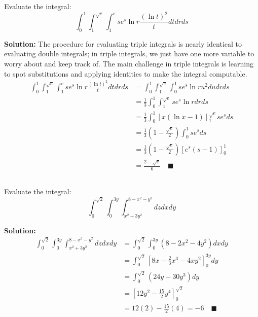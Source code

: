 \documentclass[letterpaper, 11pt]{article}
\begin{document}
\subsection{} Evaluate the integral:
\[ \int_0^1 \int_1^{\sqrt{e}} \int_1^e se^s \ln r \frac{(\ln t)^2}{t} dt dr ds \]
\par \textbf{Solution:} The procedure for evaluating triple integrals is nearly identical to evaluating double integrals; in triple integrals, we just have one more variable to worry about and keep track of. The main challenge in triple integrals is learning to spot substitutions and applying identities to make the integral computable. 
\begin{align*}
\int_0^1 \int_1^{\sqrt{e}} \int_1^e se^s \ln r \frac{(\ln t)^2}{t} dt dr ds &= \int_0^1 \int_1^{\sqrt{e}} \int_0^1 se^s \ln r u^2 du dr ds \\
&= \frac{1}{3} \int_0^1 \int_1^{\sqrt{e}} se^s \ln r dr ds \\
&= \frac{1}{3} \int_0^1 \left[ x(\ln x -1 )\right]_1^{\sqrt{e}} se^s ds  \\
&= \frac{1}{3}\left( 1 - \frac{\sqrt{e}}{2}\right) \int_0^1 se^s ds \\
&= \frac{1}{3}\left( 1 - \frac{\sqrt{e}}{2}\right) \left[ e^s(s-1) \right]_0^1 \\
&=  \frac{2 - \sqrt{e}}{6} \quad\blacksquare 
\end{align*}


\subsection{} Evaluate the integral:
\[ \int_0^{\sqrt{2}} \int_0^{3y} \int_{x^2 + 3y^2}^{8-x^2 - y^2} dz dx dy \]
\par \textbf{Solution:} 
\begin{align*}
\int_0^{\sqrt{2}} \int_0^{3y} \int_{x^2 + 3y^2}^{8-x^2 - y^2} dz dx dy &= \int_0^{\sqrt{2}} \int_0^{3y} (8 - 2x^2 - 4y^2) dx dy \\
&= \int_0^{\sqrt{2}} \left[ 8x - \frac{2}{3} x^3 - 4xy^2 \right]_0^{3y} dy \\
&= \int_0^{\sqrt{2}}(24y - 30y^3 ) dy \\
&= \left[12 y^2 - \frac{15}{2} y^4 \right]_0^{\sqrt{2}} \\
&= 12(2) - \frac{15}{2}(4) = -6 \quad\blacksquare 
\end{align*}


\end{document}
